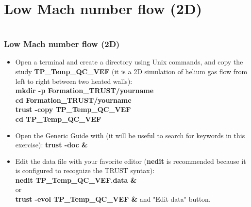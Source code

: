 \documentclass[10pt, hyperref={unicode=true,pdfusetitle, bookmarks=true,bookmarksnumbered=false,bookmarksopen=false, breaklinks=false,pdfborder={0 0 1},backref=true,colorlinks=true,linkcolor=darkblue,pageanchor}]{beamer}
\begin{document}
\section{{\bf{Low Mach number flow (2D)}}}
\begin{frame}
\begin{small}
\begin{columns}[c] 
\tableofcontents[sections={1-9},currentsection, currentsubsection]
\tableofcontents[sections={10-16},currentsection, currentsubsection]
\end{columns}
\end{small}
\end{frame}
\begin{frame}
\frametitle{Low Mach number flow (2D)}
\begin{block}{}


\begin{itemize}
\item Open a terminal and create a directory using Unix commands, and copy the study \textbf{TP\_Temp\_QC\_VEF} (it is a 2D simulation of helium gas flow from left to right between two heated walls):\\
\textbf{mkdir -p Formation\_TRUST/yourname}\\
\textbf{cd Formation\_TRUST/yourname}\\
\textbf{trust -copy TP\_Temp\_QC\_VEF}\\
\textbf{cd TP\_Temp\_QC\_VEF}

\item Open the Generic Guide with (it will be useful to search for keywords in this exercise): \textbf{trust -doc \&}

\item Edit the data file with your favorite editor (\textbf{nedit} is recommended because it is configured to recognize the TRUST syntax):\\
\textbf{nedit TP\_Temp\_QC\_VEF.data \&} \\
or \\
\textbf{trust -evol TP\_Temp\_QC\_VEF  \&} and "Edit data" button.
\end{itemize}

\end{block}
\end{frame}
\end{document}
